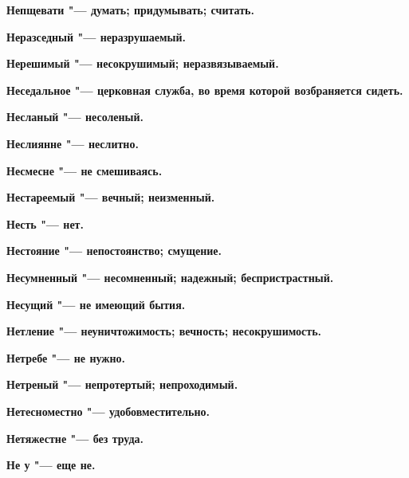 \begin{mymulticols}{2}
\bfseries Непщевати\normalfont{} "--- думать; придумывать; считать. 




\bfseries Неразседный\normalfont{} "--- неразрушаемый. 




\bfseries Нерешимый\normalfont{} "--- несокрушимый; неразвязываемый. 




\bfseries Неседальное\normalfont{} "--- церковная служба, во время которой возбраняется сидеть. 




\bfseries Несланый\normalfont{} "--- несоленый. 




\bfseries Неслиянне\normalfont{} "--- неслитно. 




\bfseries Несмесне\normalfont{} "--- не смешиваясь. 




\bfseries Нестареемый\normalfont{} "--- вечный; неизменный. 




\bfseries Несть\normalfont{} "--- нет. 




\bfseries Нестояние\normalfont{} "--- непостоянство; смущение. 




\bfseries Несумненный\normalfont{} "--- несомненный; надежный; беспристрастный. 




\bfseries Несущий\normalfont{} "--- не имеющий бытия. 




\bfseries Нетление\normalfont{} "--- неуничтожимость; вечность; несокрушимость. 




\bfseries Нетребе\normalfont{} "--- не нужно. 




\bfseries Нетреный\normalfont{} "--- непротертый; непроходимый. 




\bfseries Нетесноместно\normalfont{} "--- удобовместительно. 




\bfseries Нетяжестне\normalfont{} "--- без труда. 




\bfseries Не у\normalfont{} "--- еще не. 





\end{mymulticols}
